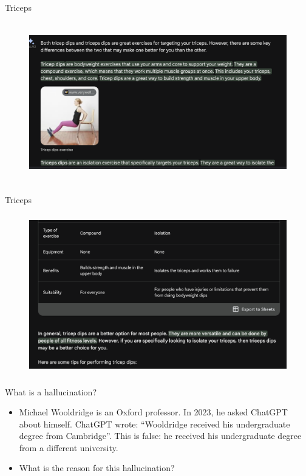 \begin{vbframe}{Triceps}
\begin{figure}
\centering
\includegraphics[height = 7cm]{figure/triceps2.png}
\end{figure}
\vfill
\end{vbframe}

\begin{vbframe}{Triceps}
\begin{figure}
\centering
\includegraphics[height = 7cm]{figure/triceps3.png}
\end{figure}
\vfill
\end{vbframe}



\begin{vbframe}{What is a hallucination?}

\vfill


	\begin{itemize}


\item
Michael Wooldridge is an Oxford professor. In 2023, he
asked ChatGPT about himself. ChatGPT wrote:
``Wooldridge received his undergraduate degree from
Cambridge''. This is false:
he received his undergraduate degree from a different
university.

\item \ques What is the reason for this hallucination?

\end{itemize}

\vfill

\end{vbframe}


